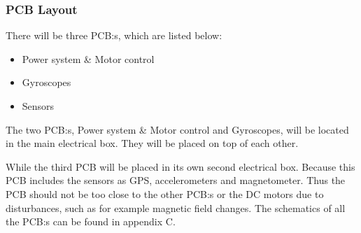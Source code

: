 \subsubsection{PCB Layout}
There will be three PCB:s, which are listed below: 

\begin{itemize}
	\item 	Power system \& Motor control
	\item	Gyroscopes 
	\item 	Sensors
\end{itemize}

The two PCB:s, Power system \& Motor control  and Gyroscopes, will be located in the main electrical box. They will be placed on top of each other. %



While the third PCB will be placed in its own second electrical box. Because this PCB includes the sensors as GPS, accelerometers and magnetometer. Thus the PCB should not be too close to the other PCB:s or the DC motors due to disturbances, such as for example magnetic field changes. The schematics of all the PCB:s can be found in appendix C.
\raggedbottom